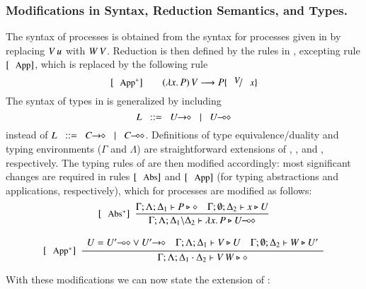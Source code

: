 \subsubsection{Modifications in Syntax, Reduction Semantics, and Types.}
The syntax of \HOpp processes is obtained from the
syntax for processes given in  by replacing 
$V\,u$ with $W\,V$.
Reduction is then defined by 
the rules in , excepting 
rule $\orule{App}$, which is replaced by 
the following rule 
$$
\orule{App$^+$} \qquad
\appl{(\abs{x}{P})}{V} \red P \subst{V}{x}
$$
The syntax of types in 
is generalized by including $$L \bnfis \shot{U} \bnfbar \lhot{U}$$
instead of $L \bnfis \shot{C} \bnfbar \lhot{C}$.
Definitions of type equivalence/duality 
and typing environments ($\Gamma$ and $\Lambda$) are straightforward extensions of 
, ,
and  , respectively. 
The typing rules of  are then modified accordingly:
most significant changes are required in rules $\trule{Abs}$ and $\trule{App}$ 
(for typing abstractions and applications, respectively), which  for \HOpp processes are modified as follows:
\[
	\begin{array}{c}
		\trule{Abs$^+$}~~\tree{
			\Gamma; \Lambda; \Delta_1 \proves P \hastype \Proc
			\quad
			\Gamma; \es; \Delta_2 \proves x \hastype U
		}{
			\Gamma; \Lambda; \Delta_1 \backslash \Delta_2 \proves \abs{x}{P} \hastype \lhot{U}
		}
		\\[6mm]

		\trule{App$^+$}~~\tree{
			\begin{array}{c}
				U = \lhot{U'} \lor \shot{U'}
				\quad
				\Gamma; \Lambda; \Delta_1 \proves V \hastype U
				\quad
				\Gamma; \es; \Delta_2 \proves W \hastype U'
			\end{array}
		}{
			\Gamma; \Lambda; \Delta_1 \cat \Delta_2 \proves \appl{V}{W} \hastype \Proc
		} 
	\end{array}
\]


With these modifications we can now state the extension of :

